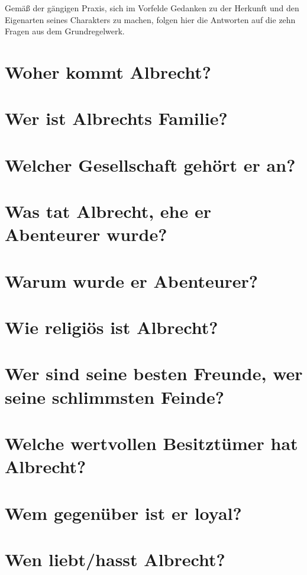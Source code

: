 Gemäß der gängigen Praxis, sich im Vorfelde Gedanken zu der Herkunft und den Eigenarten seines Charakters zu machen, folgen hier die Antworten auf die zehn Fragen aus dem Grundregelwerk.

\section{Woher kommt Albrecht?}


\section{Wer ist Albrechts Familie?}


\section{Welcher Gesellschaft gehört er an?}


\section{Was tat Albrecht, ehe er Abenteurer wurde?}


\section{Warum wurde er Abenteurer?}


\section{Wie religiös ist Albrecht?}


\section{Wer sind seine besten Freunde, wer seine schlimmsten Feinde?}


\section{Welche wertvollen Besitztümer hat Albrecht?}


\section{Wem gegenüber ist er loyal?}


\section{Wen liebt/hasst Albrecht?}

